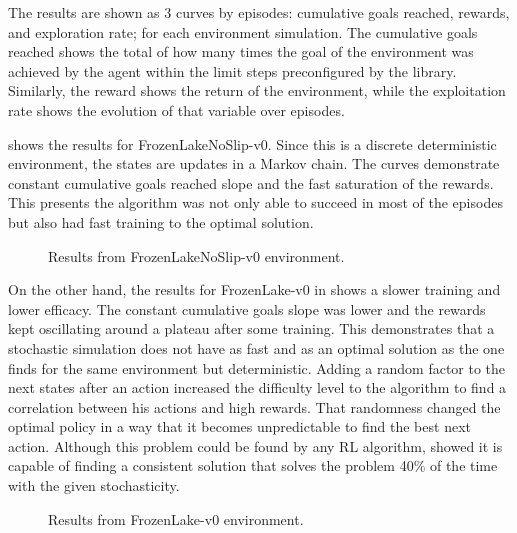 \documentclass[conference]{IEEEtran}
\begin{document}
The results are shown as 3 curves by episodes: cumulative goals reached, rewards, and exploration rate; for each environment simulation.
The cumulative goals reached shows the total of how many times the goal of the environment was achieved by the agent within the limit steps preconfigured by the library.
Similarly, the reward shows the return of the environment, while the exploitation rate shows the evolution of that variable over episodes.

 shows the results for FrozenLakeNoSlip-v0.
Since this is a discrete deterministic environment, the states are updates in a Markov chain.
The curves demonstrate constant cumulative goals reached slope and the fast saturation of the rewards.
This presents the {\Qlearning} algorithm was not only able to succeed in most of the episodes but also had fast training to the optimal solution.

\begin{figure}[!t]
    \centering
    
    \caption{Results from FrozenLakeNoSlip-v0 environment.}
    \label{results_FrozenLakeNoSlip-v0}
\end{figure}

On the other hand, the results for FrozenLake-v0 in  shows a slower training and lower efficacy.
The constant cumulative goals slope was lower and the rewards kept oscillating around a plateau after some training.
This demonstrates that a stochastic simulation does not have as fast and as an optimal solution as the one finds for the same environment but deterministic.
Adding a random factor to the next states after an action increased the difficulty level to the algorithm to find a correlation between his actions and high rewards.
That randomness changed the optimal policy in a way that it becomes unpredictable to find the best next action.
Although this problem could be found by any RL algorithm, {\Qlearning} showed it is capable of finding a consistent solution that solves the problem 40\% of the time with the given stochasticity.

\begin{figure}[!t]
    \centering
    
    \caption{Results from FrozenLake-v0 environment.}
    \label{results_FrozenLake-v0}
\end{figure}
\end{document}
